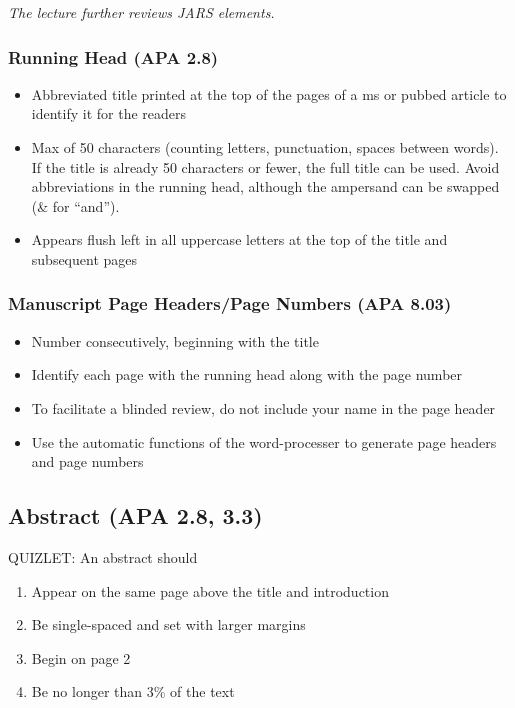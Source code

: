 \documentclass[
  11pt,
]{book}
\providecommand{\tightlist}{%
  \setlength{\itemsep}{0pt}\setlength{\parskip}{0pt}}
\begin{document}
\emph{The lecture further reviews JARS elements.}

\hypertarget{running-head-apa-2.8}{%
\subsubsection{Running Head (APA 2.8)}\label{running-head-apa-2.8}}

\begin{itemize}
\tightlist
\item
  Abbreviated title printed at the top of the pages of a ms or pubbed article to identify it for the readers
\item
  Max of 50 characters (counting letters, punctuation, spaces between words). If the title is already 50 characters or fewer, the full title can be used. Avoid abbreviations in the running head, although the ampersand can be swapped (\& for ``and'').
\item
  Appears flush left in all uppercase letters at the top of the title and subsequent pages
\end{itemize}

\hypertarget{manuscript-page-headerspage-numbers-apa-8.03}{%
\subsubsection{Manuscript Page Headers/Page Numbers (APA 8.03)}\label{manuscript-page-headerspage-numbers-apa-8.03}}

\begin{itemize}
\tightlist
\item
  Number consecutively, beginning with the title
\item
  Identify each page with the running head along with the page number
\item
  To facilitate a blinded review, do not include your name in the page header
\item
  Use the automatic functions of the word-processer to generate page headers and page numbers
\end{itemize}

\hypertarget{abstract-apa-2.8-3.3}{%
\subsection{Abstract (APA 2.8, 3.3)}\label{abstract-apa-2.8-3.3}}

QUIZLET:
An abstract should

\begin{enumerate}
\def\labelenumi{\alph{enumi}.}
\tightlist
\item
  Appear on the same page above the title and introduction
\item
  Be single-spaced and set with larger margins
\item
  Begin on page 2
\item
  Be no longer than 3\% of the text
\end{enumerate}
\end{document}
